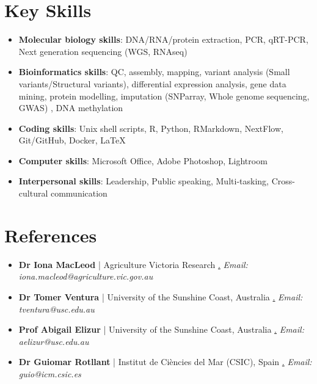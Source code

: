 \documentclass[letterpaper,11pt]{article}
\newcommand{\resumeItem}[2]{
  \item\small{
    \textbf{#1}{: #2 \vspace{0pt}}
  }
}
\newcommand{\resumeRef}[2]{
  \item\small{
    \textbf{#1} {#2}}
  }
\newcommand{\resumeSubItem}[2]{\resumeItem{#1}{#2}}
\newcommand{\resumeItemListStart}{\begin{itemize}}
\newcommand{\resumeItemListEnd}{\end{itemize}}
\begin{document}
\section{Key Skills}
 \resumeItemListStart
    \resumeSubItem{Molecular biology skills}{DNA/RNA/protein extraction, PCR, qRT-PCR, Next generation sequencing (WGS, RNAseq)}
    \resumeSubItem{Bioinformatics skills}{QC, assembly, mapping, variant analysis (Small variants/Structural variants), differential expression analysis, gene data mining, protein modelling, imputation (SNParray, Whole genome sequencing, GWAS)}, DNA methylation
    \resumeSubItem{Coding skills}{Unix shell scripts, R, Python, RMarkdown, NextFlow, Git/GitHub, Docker, LaTeX}
    \resumeSubItem{Computer skills}{Microsoft Office, Adobe Photoshop, Lightroom}
    \resumeSubItem{Interpersonal skills}{Leadership, Public speaking, Multi-tasking, Cross-cultural communication}
  \resumeItemListEnd

\section{References}
 \resumeItemListStart
    \resumeRef{Dr Iona MacLeod} | {Agriculture Victoria Research} \href{mailto:iona.mcleod@agriculture.vic.gov.au} 
    . {\textit{Email: iona.macleod@agriculture.vic.gov.au}}
    \resumeRef{Dr Tomer Ventura} | {University of the Sunshine Coast, Australia} \href{mailto:tventura@usc.edu.au} 
    . {\textit{Email: tventura@usc.edu.au}} 
    \resumeRef{Prof Abigail Elizur} | {University of the Sunshine Coast, Australia} \href{mailto:aelizur@usc.edu.au}
    . {\textit{Email: aelizur@usc.edu.au}} 
    \resumeRef{Dr Guiomar Rotllant} | {Institut de Ciències del Mar (CSIC), Spain} \href{mailto:guio@icm.csic.es} 
    . {\textit{Email: guio@icm.csic.es}} 
  \resumeItemListEnd
  
\end{document}
